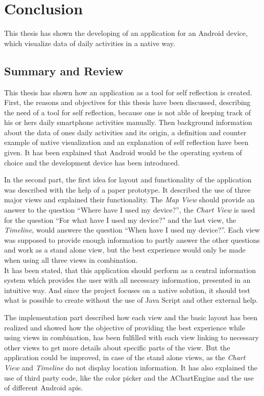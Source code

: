 \chapter{Conclusion}
\label{cha:conclusion}

This thesis has shown the developing of an application for an Android device, which visualize data of daily activities in a native way.

\section{Summary and Review}
This thesis has shown how an application as a tool for self reflection is created. First, the reasons and objectives for this thesis have been discussed, describing the need of a tool for self reflection, because one is not able of keeping track of his or hers daily smartphone activities manually. Then background information about the data of ones daily activities and its origin, a definition and counter example of native visualization and an explanation of self reflection have been given. It has been explained that Android would be the operating system of choice and the development device has been introduced.

In  the second part, the first idea for layout and functionality of the application was described with the help of a paper prototype. It described the use of three major views and explained their functionality. The \emph{Map View} should provide an answer to the question ``Where have I used my device?'', the \emph{Chart View} is used for the question ``For what have I used my device?'' and the last view, the \emph{Timeline}, would answere the question ``When have I used my device?''. Each view was supposed to provide enough information to partly answer the other questions and work as a stand alone view, but the best experience would only be made when using all three views in combination.\\
It has been stated, that this application should perform as a central information system which provides the user with all necessary information, presented in an intuitive way. And since the project focuses on a native solution, it should test what is possible to create without the use of Java Script and other external help.

The  implementation part described how each view and the basic layout has been realized and showed how the objective of providing the best experience while using views in combination, has been fulfilled with each view linking to necessary other views to get more details about specific parts of the view. But the application could be improved, in case of the stand alone views, as the \emph{Chart View} and \emph{Timeline} do not display location information. It has also explained the use of third party code, like the color picker and the AChartEngine and the use of different Android apis.

